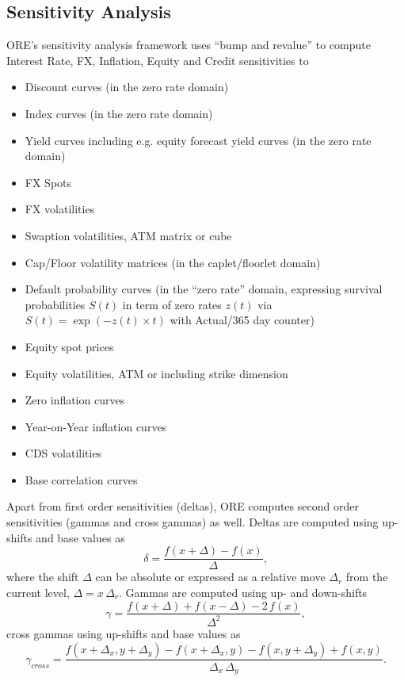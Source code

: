 \documentclass[12pt, a4paper]{article}
\begin{document}
{{\begin{appendix}
\subsection{Sensitivity Analysis}\label{sec:app_sensi}

ORE's sensitivity analysis framework uses ``bump and revalue'' to compute Interest Rate, FX, Inflation, Equity and Credit sensitivities to
\begin{itemize}
\item Discount curves  (in the zero rate domain)
\item Index curves (in the zero rate domain)
\item Yield curves including e.g. equity forecast yield curves (in the zero rate domain)
\item FX Spots
\item FX volatilities
\item Swaption volatilities, ATM matrix or cube 
\item Cap/Floor volatility matrices (in the caplet/floorlet domain)
\item Default probability curves (in the ``zero rate'' domain, expressing survival probabilities $S(t)$ in term of zero rates $z(t)$ via $S(t)=\exp(-z(t)\times t)$ with Actual/365 day counter)
\item Equity spot prices
\item Equity volatilities, ATM or including strike dimension 
\item Zero inflation curves
\item Year-on-Year inflation curves
\item CDS volatilities
\item Base correlation curves
\end{itemize}

Apart from first order sensitivities (deltas), ORE computes second order sensitivities (gammas and cross gammas) as well. Deltas are computed using up-shifts and base values as
$$
\delta = \frac{f(x+\Delta)-f(x)}{\Delta},
$$ 
where the shift $\Delta$ can be absolute or expressed as a relative move $\Delta_r$ from the current level, $\Delta=x\,\Delta_r$. Gammas are computed using up- and down-shifts
$$
\gamma = \frac{f(x+\Delta)+f(x-\Delta) - 2\,f(x)}{\Delta^2},
$$ 
cross gammas using up-shifts and base values as
$$
\gamma_{cross} = \frac{f(x+\Delta_x,y+\Delta_y)-f(x+\Delta_x,y) -f(x,y+\Delta_y) + f(x,y)}{\Delta_x\,\Delta_y}.
$$ 


\end{appendix}}}
\end{document}
